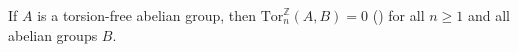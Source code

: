 \begin{proposition} \label{proposition:higher_tor_for_abelian_groups_of_torsion_free_abelian_group_vanish}
    If $A$ is a torsion-free abelian group,  
    then $\text{Tor}_n^{\mathbb{Z}}(A, B) = 0$ () for all $n \geq 1$ and all  abelian groups $B$.
\end{proposition}